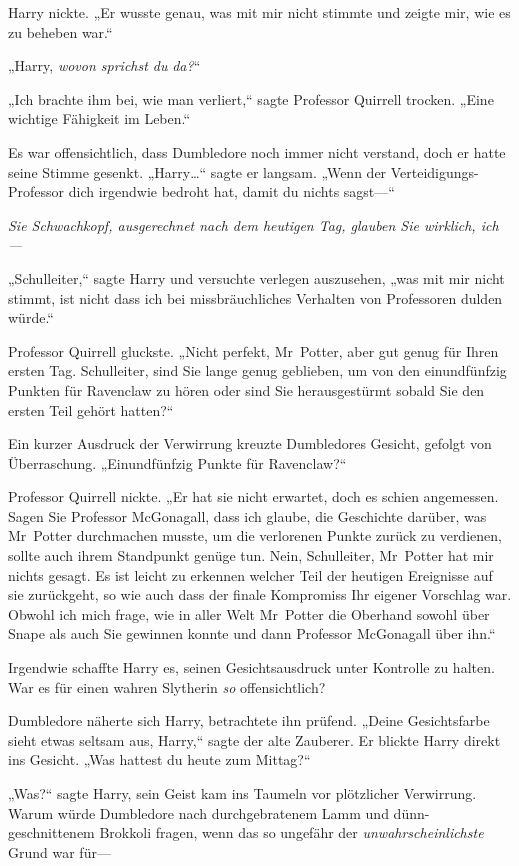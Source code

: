 {Harry nickte. „Er wusste genau, was mit mir nicht stimmte und zeigte mir, wie es zu beheben war.“

„Harry, \emph{wovon sprichst du} \emph{da?}“

„Ich brachte ihm bei, wie man verliert,“ sagte Professor Quirrell trocken. „Eine wichtige Fähigkeit im Leben.“

Es war offensichtlich, dass Dumbledore noch immer nicht verstand, doch er hatte seine Stimme gesenkt. „Harry…“ sagte er langsam. „Wenn der Verteidigungs-Professor dich irgendwie bedroht hat, damit du nichts sagst—“

\emph{Sie Schwachkopf, ausgerechnet nach dem heutigen Tag, glauben Sie wirklich, ich—}

„Schulleiter,“ sagte Harry und versuchte verlegen auszusehen, „was mit mir nicht stimmt, ist nicht dass ich bei missbräuchliches Verhalten von Professoren dulden würde.“

Professor Quirrell gluckste. „Nicht perfekt, Mr~Potter, aber gut genug für Ihren ersten Tag. Schulleiter, sind Sie lange genug geblieben, um von den einundfünfzig Punkten für Ravenclaw zu hören oder sind Sie herausgestürmt sobald Sie den ersten Teil gehört hatten?“

Ein kurzer Ausdruck der Verwirrung kreuzte Dumbledores Gesicht, gefolgt von Überraschung. „Einundfünfzig Punkte für Ravenclaw?“

Professor Quirrell nickte. „Er hat sie nicht erwartet, doch es schien angemessen. Sagen Sie Professor McGonagall, dass ich glaube, die Geschichte darüber, was Mr~Potter durchmachen musste, um die verlorenen Punkte zurück zu verdienen, sollte auch ihrem Standpunkt genüge tun. Nein, Schulleiter, Mr~Potter hat mir nichts gesagt. Es ist leicht zu erkennen welcher Teil der heutigen Ereignisse auf sie zurückgeht, so wie auch dass der finale Kompromiss Ihr eigener Vorschlag war. Obwohl ich mich frage, wie in aller Welt Mr~Potter die Oberhand sowohl über Snape als auch Sie gewinnen konnte und dann Professor McGonagall über ihn.“

Irgendwie schaffte Harry es, seinen Gesichtsausdruck unter Kontrolle zu halten. War es für einen wahren Slytherin \emph{so} offensichtlich?

Dumbledore näherte sich Harry, betrachtete ihn prüfend. „Deine Gesichtsfarbe sieht etwas seltsam aus, Harry,“ sagte der alte Zauberer. Er blickte Harry direkt ins Gesicht. „Was hattest du heute zum Mittag?“

„Was?“ sagte Harry, sein Geist kam ins Taumeln vor plötzlicher Verwirrung. Warum würde Dumbledore nach durchgebratenem Lamm und dünn-geschnittenem Brokkoli fragen, wenn das so ungefähr der \emph{unwahrscheinlichste} Grund war für—

}

